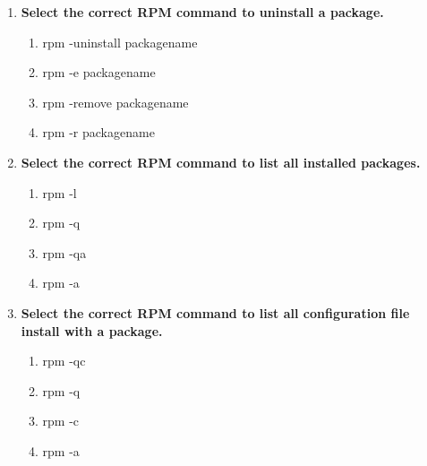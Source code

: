 \begin{flushleft}
\begin{enumerate}
		\item \textbf{Select the correct RPM command to uninstall a package.}
		\begin{enumerate}[label=(\alph*)]
			\item rpm -uninstall packagename
			\item rpm -e packagename    %
			\item rpm -remove packagename
			\item rpm -r packagename  
		\end{enumerate}
		\bigskip
		\bigskip	
		
		
		\item \textbf{Select the correct RPM command to list all installed packages.}
		\begin{enumerate}[label=(\alph*)]
			\item rpm -l
			\item rpm -q
			\item rpm -qa %
			\item rpm -a  
		\end{enumerate}
		\bigskip
		\bigskip	

		\item \textbf{Select the correct RPM command to list all configuration file install with a package.}
		\begin{enumerate}[label=(\alph*)]
			\item rpm -qc  %
			\item rpm -q
			\item rpm -c 
			\item rpm -a  
		\end{enumerate}
		\bigskip
		\bigskip	
		
	\end{enumerate}
	
	
\end{flushleft}

\newpage

